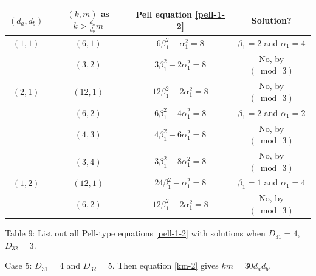 \documentclass[12pt]{article}
\begin{document}
\begin{center}
\begin{tabular}{|c|c|c|c|}
\hline $(d_a, d_b)$ & $(k, m)$ as $k > \frac{d_a}{d_b} m$ & Pell equation \eqref{pell-1-2} & Solution? \\
\hline $(1,1)$ & $(6,1)$ & $6\beta_1^2-\alpha_1^2=8$ & $\beta_1=2$ and $\alpha_1=4$\\
\hline & $(3,2)$ & $3\beta_1^2-2\alpha_1^2=8$ & No, by $(\bmod \, 3)$\\
\hline $(2,1)$ & $(12,1)$ & $12\beta_1^2-2\alpha_1^2=8$ & No, by $(\bmod \, 3)$\\
\hline & $(6,2)$ & $6\beta_1^2-4\alpha_1^2=8$ & $\beta_1=2$ and $\alpha_1=2$\\
\hline & $(4,3)$ & $4\beta_1^2-6\alpha_1^2=8$ & No, by $(\bmod \, 3)$\\
\hline & $(3,4)$ & $3\beta_1^2-8\alpha_1^2=8$ & No, by $(\bmod \, 3)$\\
\hline $(1,2)$ & $(12,1)$ & $24\beta_1^2-\alpha_1^2=8$ & $\beta_1=1$ and $\alpha_1=4$\\
\hline & $(6,2)$ & $12\beta_1^2-2\alpha_1^2=8$ & No, by $(\bmod \, 3)$\\
\hline
\end{tabular}
\newline \small{Table 9: List out all Pell-type equations \eqref{pell-1-2} with solutions when $D_{31} = 4$, $D_{32} = 3$.}
\end{center}

Case 5: $D_{31} = 4$ and $D_{32} = 5$. Then equation \eqref{km-2} gives $k m = 30 d_a d_b$.
\end{document}
